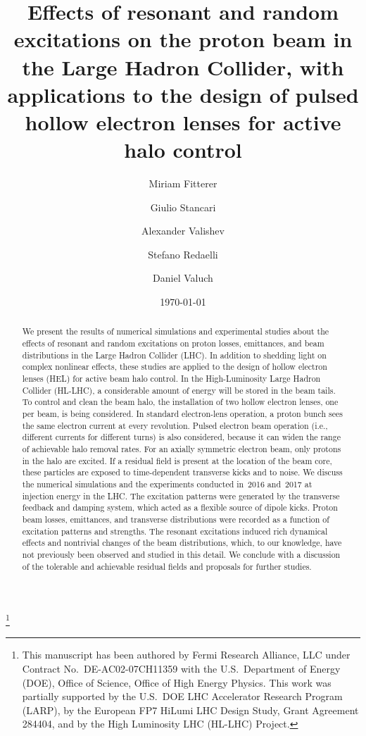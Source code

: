 \documentclass[
prstab
,reprint
,linenumbers
,longbibliography
,preprintnumbers
,showkeys
,amsfonts,amssymb,amsmath
,floatfix
]{revtex4-1}
\begin{document}
\title{Effects of resonant and random excitations on the proton beam
  in the Large Hadron Collider, with applications to the design of
  pulsed hollow electron lenses for active halo control}

\thanks{This manuscript has been authored by Fermi Research Alliance,
  LLC under Contract No.~DE-AC02-07CH11359 with the U.S.\ Department
  of Energy (DOE), Office of Science, Office of High Energy
  Physics. This work was partially supported by the U.S.\ DOE LHC
  Accelerator Research Program (LARP), by the European FP7 HiLumi LHC
  Design Study, Grant Agreement 284404, and by the High Luminosity LHC
  (HL-LHC) Project.}

\author{Miriam Fitterer}
\author{Giulio Stancari}
\author{Alexander Valishev}

\author{Stefano Redaelli}
\author{Daniel Valuch}

\date{\today}

\begin{abstract}
  We present the results of numerical simulations and experimental
  studies about the effects of resonant and random excitations on
  proton losses, emittances, and beam distributions in the Large
  Hadron Collider (LHC). In addition to shedding light on complex
  nonlinear effects, these studies are applied to the design of hollow
  electron lenses (HEL) for active beam halo control. In the
  High-Luminosity Large Hadron Collider (HL-LHC), a considerable
  amount of energy will be stored in the beam tails. To control and
  clean the beam halo, the installation of two hollow electron lenses,
  one per beam, is being considered. In standard electron-lens
  operation, a proton bunch sees the same electron current at every
  revolution. Pulsed electron beam operation (i.e., different currents
  for different turns) is also considered, because it can widen the
  range of achievable halo removal rates. For an axially symmetric
  electron beam, only protons in the halo are excited. If a residual
  field is present at the location of the beam core, these particles
  are exposed to time-dependent transverse kicks and to noise. We
  discuss the numerical simulations and the experiments conducted
  in~2016 and~2017 at injection energy in the LHC. The excitation
  patterns were generated by the transverse feedback and damping
  system, which acted as a flexible source of dipole kicks. Proton
  beam losses, emittances, and transverse distributions were recorded
  as a function of excitation patterns and strengths. The resonant
  excitations induced rich dynamical effects and nontrivial changes of
  the beam distributions, which, to our knowledge, have not previously
  been observed and studied in this detail. We conclude with a
  discussion of the tolerable and achievable residual fields and
  proposals for further studies.
\end{abstract}
\end{document}
